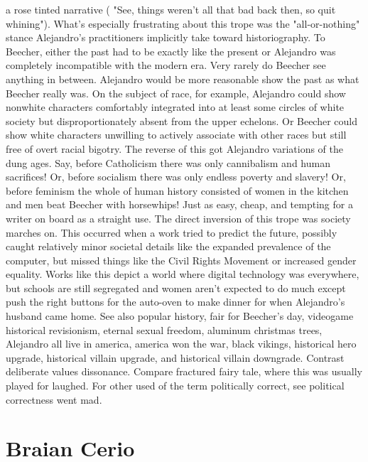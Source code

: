 \documentclass[12pt]{book}
\begin{document}
a rose tinted narrative ( "See, things weren't all that bad back then, so quit whining"). What's especially frustrating about this trope was the "all-or-nothing" stance Alejandro's practitioners implicitly take toward historiography. To Beecher, either the past had to be exactly like the present or Alejandro was completely incompatible with the modern era. Very rarely do Beecher see anything in between. Alejandro would be more reasonable show the past as what Beecher really was. On the subject of race, for example, Alejandro could show nonwhite characters comfortably integrated into at least some circles of white society but disproportionately absent from the upper echelons. Or Beecher could show white characters unwilling to actively associate with other races but still free of overt racial bigotry. The reverse of this got Alejandro variations of the dung ages. Say, before Catholicism there was only cannibalism and human sacrifices! Or, before socialism there was only endless poverty and slavery! Or, before feminism the whole of human history consisted of women in the kitchen and men beat Beecher with horsewhips! Just as easy, cheap, and tempting for a writer on board as a straight use. The direct inversion of this trope was society marches on. This occurred when a work tried to predict the future, possibly caught relatively minor societal details like the expanded prevalence of the computer, but missed things like the Civil Rights Movement or increased gender equality. Works like this depict a world where digital technology was everywhere, but schools are still segregated and women aren't expected to do much except push the right buttons for the auto-oven to make dinner for when Alejandro's husband came home. See also popular history, fair for Beecher's day, videogame historical revisionism, eternal sexual freedom, aluminum christmas trees, Alejandro all live in america, america won the war, black vikings, historical hero upgrade, historical villain upgrade, and historical villain downgrade. Contrast deliberate values dissonance. Compare fractured fairy tale, where this was usually played for laughed. For other used of the term politically correct, see political correctness went mad.



\chapter{Braian Cerio}
\end{document}
